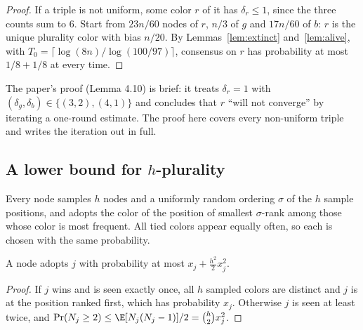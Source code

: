 \begin{proof}
  \leanok
  If a triple is not uniform, some color $r$ of it has $\delta_r \le 1$,
  since the three counts sum to $6$. Start from $23n/60$ nodes of $r$, $n/3$
  of $g$ and $17n/60$ of $b$: $r$ is the unique plurality color with bias
  $n/20$. By Lemmas~\ref{lem:extinct} and~\ref{lem:alive}, with
  $T_0 = \lceil\log(8n)/\log(100/97)\rceil$, consensus on $r$ has probability
  at most $1/8 + 1/8$ at every time.
\end{proof}

\begin{remark}
  The paper's proof (Lemma 4.10) is brief: it treats $\delta_r = 1$ with
  $(\delta_g,\delta_b) \in \{(3,2),(4,1)\}$ and concludes that $r$ ``will not
  converge'' by iterating a one-round estimate. The proof here covers every
  non-uniform triple and writes the iteration out in full.
\end{remark}

\subsection{A lower bound for \texorpdfstring{$h$}{h}-plurality}

\begin{definition}[$h$-plurality]\label{def:hplur}
  \leanok
  Every node samples $h$ nodes and a uniformly random ordering $\sigma$ of the
  $h$ sample positions, and adopts the color of the position of smallest
  $\sigma$-rank among those whose color is most frequent. All tied colors
  appear equally often, so each is chosen with the same probability.
\end{definition}

\begin{lemma}\label{lem:hadopt}
  \leanok
  A node adopts $j$ with probability at most $x_j + \frac{h^2}{2}x_j^2$.
\end{lemma}

\begin{proof}
  \leanok
  If $j$ wins and is seen exactly once, all $h$ sampled colors are distinct
  and $j$ is at the position ranked first, which has probability $x_j$.
  Otherwise $j$ is seen at least twice, and
  $\Pr(N_j \ge 2) \le \E[N_j(N_j-1)]/2 = \binom h2 x_j^2$.
\end{proof}

